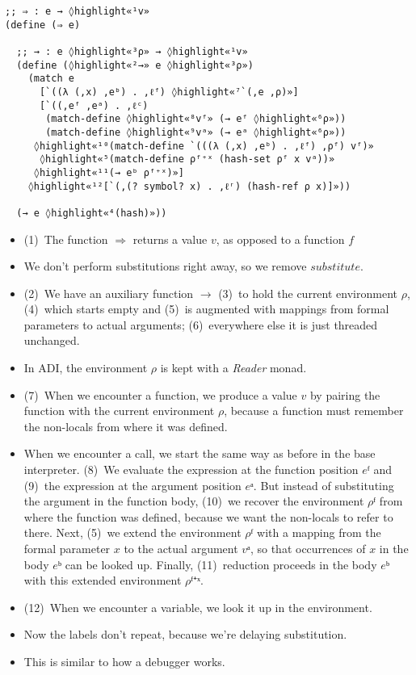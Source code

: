 \documentclass[12pt, oneside]{book}
\begin{document}
\begin{Verbatim}
;; ⇒ : e → ◊highlight«¹v»
(define (⇒ e)

  ;; → : e ◊highlight«³ρ» → ◊highlight«¹v»
  (define (◊highlight«²→» e ◊highlight«³ρ»)
    (match e
      [`((λ (,x) ,eᵇ) . ,ℓᶠ) ◊highlight«⁷`(,e ,ρ)»]
      [`((,eᶠ ,eᵃ) . ,ℓᶜ)
       (match-define ◊highlight«⁸vᶠ» (→ eᶠ ◊highlight«⁶ρ»))
       (match-define ◊highlight«⁹vᵃ» (→ eᵃ ◊highlight«⁶ρ»))
     ◊highlight«¹⁰(match-define `(((λ (,x) ,eᵇ) . ,ℓᶠ) ,ρᶠ) vᶠ)»
      ◊highlight«⁵(match-define ρᶠ⁺ˣ (hash-set ρᶠ x vᵃ))»
     ◊highlight«¹¹(→ eᵇ ρᶠ⁺ˣ)»]
    ◊highlight«¹²[`(,(? symbol? x) . ,ℓʳ) (hash-ref ρ x)]»))

  (→ e ◊highlight«⁴(hash)»))
\end{Verbatim}

\begin{itemize}
  \item (1)~The function \(⇒\) returns a value \(v\), as opposed to a function \(f\)
  \item We don’t perform substitutions right away, so we remove \(substitute\).
  \item (2)~We have an auxiliary function \(→\) (3)~to hold the current environment \(ρ\), (4)~which starts empty and (5)~is augmented with mappings from formal parameters to actual arguments; (6)~everywhere else it is just threaded unchanged.
  \item In ADI, the environment \(ρ\) is kept with a \emph{Reader} monad.
  \item (7)~When we encounter a function, we produce a value \(v\) by pairing the function with the current environment \(ρ\), because a function must remember the non-locals from where it was defined.
  \item When we encounter a call, we start the same way as before in the base interpreter. (8)~We evaluate the expression at the function position \(eᶠ\) and (9)~the expression at the argument position \(eᵃ\). But instead of substituting the argument in the function body, (10)~we recover the environment \(ρᶠ\) from where the function was defined, because we want the non-locals to refer to there. Next, (5)~we extend the environment \(ρᶠ\) with a mapping from the formal parameter \(x\) to the actual argument \(vᵃ\), so that occurrences of \(x\) in the body \(eᵇ\) can be looked up. Finally, (11)~reduction proceeds in the body \(eᵇ\) with this extended environment \(ρᶠ⁺ˣ\).
  \item (12)~When we encounter a variable, we look it up in the environment.
  \item Now the labels don’t repeat, because we’re delaying substitution.
  \item This is similar to how a debugger works.
\end{itemize}
\end{document}
